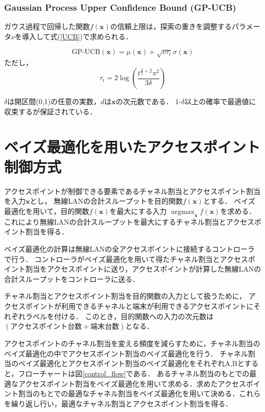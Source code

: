 \documentclass[a4paper,11pt]{jarticle}
\DeclareMathOperator*{\argmax}{argmax}
\begin{document}
\subsubsection{Gaussian Process Upper Confidence Bound (GP-UCB)}
ガウス過程で回帰した関数$f(\mathbf{x})$の信頼上限は，探索の重きを調整するパラメータ$\nu$を導入して式(\ref{UCB})で求められる．

\begin{equation}
  \text{GP-UCB}(\mathbf{x})=\mu(\mathbf{x})+\sqrt{\nu\tau_t}\sigma(\mathbf{x}) \label{UCB}
\end{equation}
ただし，
$$\tau_t=2\log\left(\frac{t^{\frac{d}{2}+2}\pi^2}{3\delta}\right)$$

$\delta$は開区間(0,1)の任意の実数，$d$は$\mathbf{x}$の次元数である．
1-$\delta$以上の確率で最適値に収束するが保証されている\cite{Srinivas}．

\section{ベイズ最適化を用いたアクセスポイント制御方式}
アクセスポイントが制御できる要素であるチャネル割当とアクセスポイント割当を入力$\mathbf{x}$とし，
無線LANの合計スループットを目的関数$f(\mathbf{x})$とする．
ベイズ最適化を用いて，目的関数$f(\mathbf{x})$を最大にする入力
$\argmax_{\mathbf{x}} f(\mathbf{x})$を求める．
これにより無線LANの合計スループットを最大にするチャネル割当とアクセスポイント割当を得る．

ベイズ最適化の計算は無線LANの全アクセスポイントに接続するコントローラで行う．
コントローラがベイズ最適化を用いて得たチャネル割当とアクセスポイント割当をアクセスポイントに送り，アクセスポイントが計算した無線LANの合計スループットをコントローラに送る．

チャネル割当とアクセスポイント割当を目的関数の入力として扱うために，
アクセスポイントが利用できるチャネルと端末が利用できるアクセスポイントにそれぞれラベルを付ける．
このとき，目的関数への入力の次元数は$(アクセスポイント台数+端末台数)$となる．

アクセスポイントのチャネル割当を変える頻度を減らすために，チャネル割当のベイズ最適化の中でアクセスポイント割当のベイズ最適化を行う．
チャネル割当のベイズ最適化とアクセスポイント割当のベイズ最適化をそれぞれA,Bとすると，フローチャートは図\ref{control_flow}である．
あるチャネル割当のもとでの最適なアクセスポイント割当をベイズ最適化を用いて求める．求めたアクセスポイント割当のもとでの最適なチャネル割当をベイズ最適化を用いて決める．これらを繰り返し行い，最適なチャネル割当とアクセスポイント割当を得る．
\end{document}
